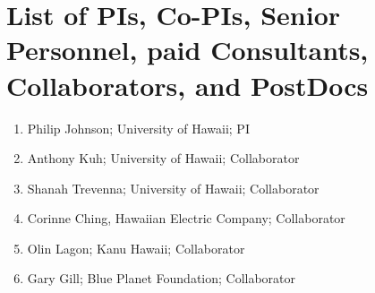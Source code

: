 \documentclass{proposalnsf}
\begin{document}
\section*{List of PIs, Co-PIs, Senior Personnel, paid Consultants,  Collaborators, and PostDocs}


\begin{enumerate}
\item Philip Johnson; University of Hawaii; PI
\item Anthony Kuh; University of Hawaii; Collaborator
\item Shanah Trevenna; University of Hawaii; Collaborator
\item Corinne Ching, Hawaiian Electric Company; Collaborator
\item Olin Lagon; Kanu Hawaii; Collaborator
\item Gary Gill; Blue Planet Foundation; Collaborator
\end{enumerate}
\end{document}
